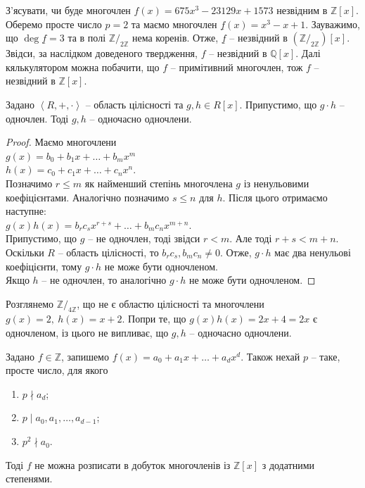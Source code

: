 \documentclass{math_library}
\begin{document}
\begin{example}
З'ясувати, чи буде многочлен $f(x) = 675x^3 - 23129x + 1573$ незвідним в $\mathbb{Z}[x]$.\\
Оберемо просте число $p = 2$ та маємо многочлен $\underline{f}(x) = x^3 - x + 1$. Зауважимо, що $\deg \underline{f} = 3$ та в полі $\mathbb{Z}/_{2 \mathbb{Z}}$ нема коренів. Отже, $\underline{f}$ -- незвідний в $\left(\mathbb{Z}/_{2 \mathbb{Z}}\right)[x]$. Звідси, за наслідком доведеного твердження, $f$ -- незвідний в $\mathbb{Q}[x]$. Далі кялькулятором можна побачити, що $f$ -- примітивний многочлен, тож $f$ -- незвідний в $\mathbb{Z}[x]$.
\end{example}

\begin{lemma}
Задано $\left< R, + ,\cdot \right>$ -- область цілісності та $g,h \in R[x]$. Припустимо, що $g \cdot h$ -- одночлен. Тоді $g,h$ -- одночасно одночлени. 
\end{lemma}

\begin{proof}
Маємо многочлени\\
$g(x) = b_0 + b_1 x + \dots + b_m x^m$\\
$h(x) = c_0 + c_1 x + \dots + c_n x^n$.\\
Позначимо $r \leq m$ як найменший степінь многочлена $g$ із ненульовими коефіцієнтами. Аналогічно позначимо $s \leq n$ для $h$. Після цього отримаємо наступне:\\
$g(x)h(x) = b_r c_s x^{r+s} + \dots + b_m c_n x^{m+n}$.\\
Припустимо, що $g$ -- не одночлен, тоді звідси $r < m$. Але тоді $r+s < m+n$. Оскільки $R$ -- область цілісності, то $b_r c_s, b_m c_n \neq 0$. Отже, $g \cdot h$ має два ненульові коефіцієнти, тому $g \cdot h$ не може бути одночленом.\\
Якщо $h$ -- не одночлен, то аналогічно $g \cdot h$ не може бути одночленом.
\end{proof}

\begin{remark}
Розглянемо $\mathbb{Z}/_{4 \mathbb{Z}}$, що не є областю цілісності та многочлени $g(x) = 2,\ h(x) = x+2$. Попри те, що $g(x)h(x) = 2x + 4 = 2x$ є одночленом, із цього не випливає, що $g,h$ -- одночасно одночлени.
\end{remark}

\begin{theorem}
Задано $f \in \mathbb{Z}$, запишемо $f(x) = a_0 + a_1 x + \dots + a_d x^d$. Також нехай $p$ -- таке, просте число, для якого
\begin{enumerate}[nosep, wide=0pt, label={\arabic*)}]
\item $p \nmid a_d$;
\item $p \mid a_0,a_1,\dots,a_{d-1}$;
\item $p^2 \nmid a_0$.
\end{enumerate}
Тоді $f$ не можна розписати в добуток многочленів із $\mathbb{Z}[x]$ з додатними степенями.
\end{theorem}
\end{document}
